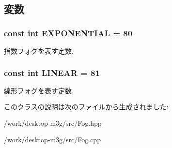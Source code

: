 \subsection{変数}
\hypertarget{classm3g_1_1Fog_86b391da2e58c0448712a10f6609a62c}{
\subsubsection[{EXPONENTIAL}]{\setlength{\rightskip}{0pt plus 5cm}const int {\bf EXPONENTIAL} = 80}}
\label{classm3g_1_1Fog_86b391da2e58c0448712a10f6609a62c}


指数フォグを表す定数. \hypertarget{classm3g_1_1Fog_23ccf193c67257f1be26417041cecb31}{
\subsubsection[{LINEAR}]{\setlength{\rightskip}{0pt plus 5cm}const int {\bf LINEAR} = 81}}
\label{classm3g_1_1Fog_23ccf193c67257f1be26417041cecb31}


線形フォグを表す定数. 

このクラスの説明は次のファイルから生成されました:\begin{CompactItemize}
\item 
/work/desktop-m3g/src/Fog.hpp\item 
/work/desktop-m3g/src/Fog.cpp\end{CompactItemize}
